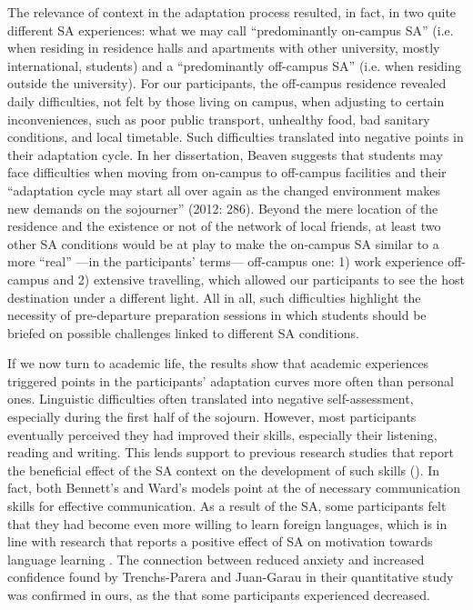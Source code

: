 \documentclass[output=paper]{langsci/langscibook}
\begin{document}
The relevance of context in the adaptation process resulted, in fact, in two quite different SA experiences: what we may call “predominantly on-campus SA” (i.e. when residing in residence halls and apartments with other university, mostly international, students) and a “predominantly off-campus SA” (i.e. when residing outside the university). For our participants, the off-campus residence revealed daily difficulties, not felt by those living on campus, when adjusting to certain inconveniences, such as poor public transport, unhealthy food, bad sanitary conditions, and local timetable. Such difficulties translated into negative  points in their adaptation cycle. In her dissertation, Beaven suggests that students may face difficulties when moving from on-campus to off-campus facilities and their “adaptation cycle may start all over again as the changed environment makes new demands on the sojourner” (2012: 286). Beyond the mere location of the residence and the existence or not of the network of local friends, at least two other SA conditions would be at play to make the on-campus SA similar to a more “real” —in the participants’ terms— off-campus one: 1) work experience off-campus and 2) extensive travelling, which allowed our participants to see the host destination under a different light. All in all, such difficulties highlight the necessity of pre-departure preparation sessions in which students should be briefed on possible challenges linked to different SA conditions.

If we now turn to academic life, the results show that academic experiences triggered  points in the participants’ adaptation curves more often than personal ones. Linguistic difficulties often translated into negative self-assess\-ment, especially during the first half of the sojourn. However, most participants eventually perceived they had improved their  skills, especially their listening, reading and writing. This lends support to previous research studies that report the beneficial effect of the SA context on the development of such skills (\citealt{Pérez-Vidal2014}). In fact, both Bennett’s and Ward’s models point at the  of necessary communication skills for effective  communication. As a result of the SA, some participants felt that they had become even more willing to learn foreign languages, which is in line with research that reports a positive effect of SA on motivation towards language learning \citep{Trenchs-PareraJuan-Garau2014}. The connection between reduced anxiety and increased  confidence found by Trenchs-Parera and Juan-Garau in their quantitative study was confirmed in ours, as the  that some participants experienced decreased. 
\end{document}
